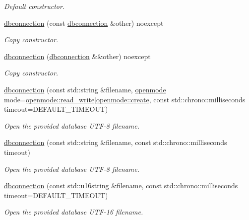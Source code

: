 \begin{DoxyCompactItemize}
\begin{DoxyCompactList}\small\item\em Default constructor. \end{DoxyCompactList}\item 
\hyperlink{a00004_a6c17517eb1631c15b64a0c54dd5355ca}{dbconnection} (const \hyperlink{a00004}{dbconnection} \&other) noexcept
\begin{DoxyCompactList}\small\item\em Copy constructor. \end{DoxyCompactList}\item 
\hyperlink{a00004_a31b78d1afbfc6147319eabb9f0e23bc5}{dbconnection} (\hyperlink{a00004}{dbconnection} \&\&other) noexcept
\begin{DoxyCompactList}\small\item\em Copy constructor. \end{DoxyCompactList}\item 
\hyperlink{a00004_a65e20f08669b49b018614cddd47efa77}{dbconnection} (const std\-::string \&filename, \hyperlink{a00038_ac886eded97b0430b2ab92e2d08fcf938}{openmode} mode=\hyperlink{a00038_ac886eded97b0430b2ab92e2d08fcf938a06ad287ea83b37a6f9db3d8d10d72c8f}{openmode\-::read\-\_\-write}$\vert$\hyperlink{a00038_ac886eded97b0430b2ab92e2d08fcf938a76ea0bebb3c22822b4f0dd9c9fd021c5}{openmode\-::create}, const std\-::chrono\-::milliseconds timeout=D\-E\-F\-A\-U\-L\-T\-\_\-\-T\-I\-M\-E\-O\-U\-T)
\begin{DoxyCompactList}\small\item\em Open the provided database U\-T\-F-\/8 filename. \end{DoxyCompactList}\item 
\hyperlink{a00004_a4de544133c1a430855624c94986ed16c}{dbconnection} (const std\-::string \&filename, const std\-::chrono\-::milliseconds timeout)
\begin{DoxyCompactList}\small\item\em Open the provided database U\-T\-F-\/8 filename. \end{DoxyCompactList}\item 
\hyperlink{a00004_a1ac3a4126d0c5da0773f14e9ac443678}{dbconnection} (const std\-::u16string \&filename, const std\-::chrono\-::milliseconds timeout=D\-E\-F\-A\-U\-L\-T\-\_\-\-T\-I\-M\-E\-O\-U\-T)
\begin{DoxyCompactList}\small\item\em Open the provided database U\-T\-F-\/16 filename. \end{DoxyCompactList}\item 

\end{DoxyCompactItemize}
